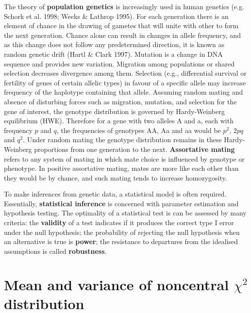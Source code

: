 The theory of {\bf population genetics} is increasingly used in human genetics
(e.g.  Schork et al.  1998; Weeks \& Lathrop 1995).  For each generation there
is an element of chance in the drawing of gametes that will unite with other to
form the next generation.  Chance alone can result in changes in allele
frequency, and as this change does not follow any predetermined direction, it
is known as random genetic drift (Hartl \& Clark 1997).  Mutation is a change
in DNA sequence and provides new variation.  Migration among populations or
shared selection decreases divergence among them.  Selection (e.g.,
differential survival or fertility of genes of certain allelic types) in favour
of a specific allele may increase frequency of the haplotype containing that
allele.  Assuming random mating and absence of disturbing forces such as
migration, mutation, and selection for the gene of interest, the genotype
distribution is governed by Hardy-Weinberg equilibrium (HWE).  Therefore for a
gene with two alleles A and a, each with frequency $p$ and $q$, the frequencies
of genotypes AA, Aa and aa would be $p^2$, $2pq$ and $q^2$.  Under random
mating the genotype distribution remains in these Hardy-Weinberg proportions
from one generation to the next.  {\bf Assortative mating} refers to any system
of mating in which mate choice is influenced by genotype or phenotype.  In
positive assortative mating, mates are more like each other than they would be
by chance, and such mating tends to increase homozygosity.

To make inferences from genetic data, a statistical model is often required.
Essentially, {\bf statistical inference} is concerned with parameter
estimation and hypothesis testing.  The optimality of a statistical test is can
be assessed by many criteria:  the {\bf validity} of a test indicates if it
produces the correct type I error under the null hypothesis;  the probability
of rejecting the null hypothesis when an alternative is true is {\bf power};
the resistance to departures from the idealised assumptions is called {\bf
robustness}.

\section{Mean and variance of noncentral $\chi^2$ distribution}

